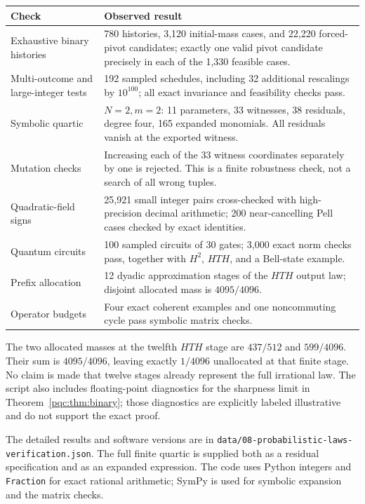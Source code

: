 \documentclass[11pt,letterpaper]{article}
\numberwithin{equation}{section}
\theoremstyle{definition}
\theoremstyle{remark}
\newcommand{\code}[1]{\nolinkurl{#1}}
\begin{document}
\begin{center}
\small
\begin{tabular}{p{}p{}}
\toprule
Check & Observed result\\
\midrule
Exhaustive binary histories &
780 histories, 3,120 initial-mass cases, and 22,220 forced-pivot candidates;
exactly one valid pivot candidate precisely in each of the 1,330 feasible
cases.\\[3pt]
Multi-outcome and large-integer tests &
192 sampled schedules, including 32 additional rescalings by $10^{100}$;
all exact invariance and feasibility checks pass.\\[3pt]
Symbolic quartic &
$N=2,m=2$: 11 parameters, 33 witnesses, 38 residuals, degree four, 165
expanded monomials. All residuals vanish at the exported witness.\\[3pt]
Mutation checks &
Increasing each of the 33 witness coordinates separately by one is rejected.
This is a finite robustness check, not a search of all wrong tuples.\\[3pt]
Quadratic-field signs &
25,921 small integer pairs cross-checked with high-precision decimal
arithmetic; 200 near-cancelling Pell cases checked by exact identities.\\[3pt]
Quantum circuits &
100 sampled circuits of 30 gates; 3,000 exact norm checks pass, together with
$H^2$, $HTH$, and a Bell-state example.\\[3pt]
Prefix allocation &
12 dyadic approximation stages of the $HTH$ output law; disjoint allocated
mass is $4095/4096$.\\[3pt]
Operator budgets &
Four exact coherent examples and one noncommuting cycle pass symbolic
matrix checks.\\
\bottomrule
\end{tabular}
\end{center}

The two allocated masses at the twelfth $HTH$ stage are $437/512$ and
$599/4096$. Their sum is $4095/4096$, leaving exactly $1/4096$ unallocated
at that finite stage. No claim is made that twelve stages already represent
the full irrational law. The script also includes floating-point diagnostics
for the sharpness limit in Theorem~\ref{pqc:thm:binary}; those diagnostics are
explicitly labeled illustrative and do not support the exact proof.

The detailed results and software versions are in
\code{data/08-probabilistic-laws-verification.json}. The full finite quartic is supplied
both as a residual specification and as an expanded expression. The code
uses Python integers and \code{Fraction} for exact rational arithmetic;
SymPy is used for symbolic expansion and the matrix checks.
\end{document}
